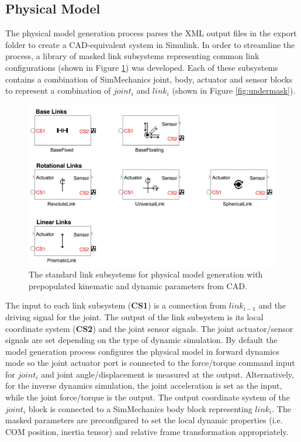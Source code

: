 \subsection{Physical Model} %
\label{sub:physical_model}

The physical model generation process parses the XML output files in the export folder to create a CAD-equivalent system in Simulink. In order to streamline the process, a library of masked link subsystems representing common link configurations (shown in Figure \ref{fig:quarcmech}) was developed. Each of these subsystems contains a combination of SimMechanics joint, body, actuator and sensor blocks to represent a combination of $joint_{i}$ and $link_{i}$ (shown in Figure \ref{fig:undermask}).

\begin{figure}[!h]
	\centering
    \includegraphics[scale=0.75]{fig/toolchain/simmech.pdf}
  	\caption{The standard link subsystems for physical model generation with prepopulated kinematic and dynamic parameters from CAD.}
	\label{fig:quarcmech}
\end{figure}

The input to each link subsystem (\textbf{CS1}) is a connection from $link_{i-1}$ and the driving signal for the joint. The output of the link subsystem is its local coordinate system (\textbf{CS2}) and the joint sensor signals. The joint actuator/sensor signals are set depending on the type of dynamic simulation. By default the model generation process configures the physical model in forward dynamics mode so the joint actuator port is connected to the force/torque command input for $joint_{i}$ and joint angle/displacement is measured at the output. Alternatively, for the inverse dynamics simulation, the joint acceleration is set as the input, while the joint force/torque is the output. The output coordinate system of the $joint_{i}$ block is connected to a SimMechanics body block representing $link_{i}$. The masked parameters are preconfigured to set the local dynamic properties (i.e. COM position, inertia tensor) and relative frame transformation appropriately.

